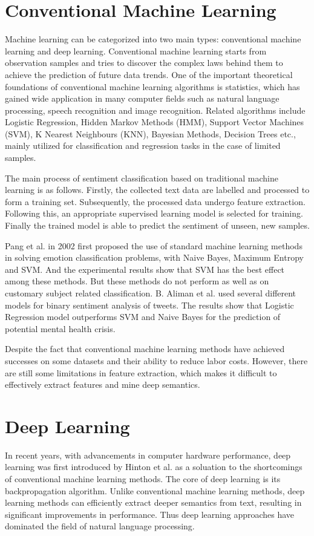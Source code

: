 \documentclass[ %
                    author={Louis Wang},
                supervisor={Dr. Qiang Liu},
                    degree={MSc},
                     title={Identification of Suicide Ideation in Texts},
                      type={},
                      year={2024}]{dissertation}
\begin{document}
\section{Conventional Machine Learning}
\noindent
Machine learning can be categorized into two main types: conventional machine learning and deep learning. Conventional machine learning starts from observation samples and tries to discover the complex laws behind them to achieve the prediction of future data trends. One of the important theoretical foundations of conventional machine learning algorithms is statistics, which has gained wide application in many computer fields such as natural language processing, speech recognition and image recognition. Related algorithms include Logistic Regression, Hidden Markov Methods (HMM), Support Vector Machines (SVM), K Nearest Neighbours (KNN), Bayesian Methods, Decision Trees etc., mainly utilized for classification and regression tasks in the case of limited samples.

The main process of sentiment classification based on traditional machine learning is as follows. Firstly, the collected text data are labelled and processed to form a training set. Subsequently, the processed data undergo feature extraction. Following this, an appropriate supervised learning model is selected for training. Finally the trained model is able to predict the sentiment of unseen, new samples.

Pang et al. in 2002 first proposed the use of standard machine learning methods in solving emotion classification problems, with Naive Bayes, Maximum Entropy and SVM. And the experimental results show that SVM has the best effect among these methods. But these methods do not perform as well as on customary subject related classification.\cite{pang2002thumbs} B. Aliman et al. used several different models for binary sentiment analysis of tweets. The results show that Logistic Regression model outperforms SVM and Naive Bayes for the prediction of potential mental health crisis. \cite{aliman2022sentiment}

Despite the fact that conventional machine learning methods have achieved successes on some datasets and their ability to reduce labor costs. However, there are still some limitations in feature extraction, which makes it difficult to effectively extract features and mine deep semantics.

\section{Deep Learning}
\noindent
In recent years, with advancements in computer hardware performance, deep learning was first introduced by Hinton et al.\cite{hinton2006reducing} as a soluation to the shortcomings of conventional machine learning methods. The core of deep learning is its backpropagation algorithm. Unlike conventional machine learning methods, deep learning methods can efficiently extract deeper semantics from text, resulting in significant improvements in performance. Thus deep learning approaches have dominated the field of natural language processing.
\end{document}
